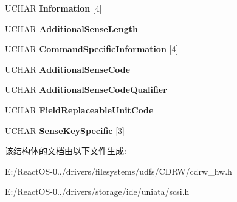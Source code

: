 \begin{DoxyCompactItemize}
\mbox{\label{struct___s_e_n_s_e___d_a_t_a_a54321428c83c8d4b6182c6580e15c196}} 
U\+C\+H\+AR {\bfseries Information} \mbox{[}4\mbox{]}
\item 
\mbox{\label{struct___s_e_n_s_e___d_a_t_a_a3842f7eef44813a252aa76356e984da2}} 
U\+C\+H\+AR {\bfseries Additional\+Sense\+Length}
\item 
\mbox{\label{struct___s_e_n_s_e___d_a_t_a_af22cdf511c6f4bd1463afe7e532eaf95}} 
U\+C\+H\+AR {\bfseries Command\+Specific\+Information} \mbox{[}4\mbox{]}
\item 
\mbox{\label{struct___s_e_n_s_e___d_a_t_a_a48db4ae264d3bdb9c1337026cd3c0804}} 
U\+C\+H\+AR {\bfseries Additional\+Sense\+Code}
\item 
\mbox{\label{struct___s_e_n_s_e___d_a_t_a_a8e9f206df386427eecf0902104312bed}} 
U\+C\+H\+AR {\bfseries Additional\+Sense\+Code\+Qualifier}
\item 
\mbox{\label{struct___s_e_n_s_e___d_a_t_a_a6b0d3ec4e439d8789f0a8864d315e8d0}} 
U\+C\+H\+AR {\bfseries Field\+Replaceable\+Unit\+Code}
\item 
\mbox{\label{struct___s_e_n_s_e___d_a_t_a_a707a98ae1800be59b0d50ed63ffb643c}} 
U\+C\+H\+AR {\bfseries Sense\+Key\+Specific} \mbox{[}3\mbox{]}
\end{DoxyCompactItemize}


该结构体的文档由以下文件生成\+:\begin{DoxyCompactItemize}
\item 
E\+:/\+React\+O\+S-\/0../drivers/filesystems/udfs/\+C\+D\+R\+W/cdrw\+\_\+hw.\+h\item 
E\+:/\+React\+O\+S-\/0../drivers/storage/ide/uniata/scsi.\+h\end{DoxyCompactItemize}
